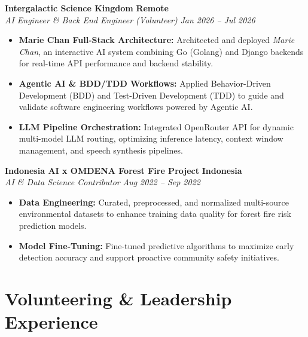 \documentclass[letterpaper,10pt]{article}
\begin{document}
\noindent \textbf{\large Intergalactic Science Kingdom} \hfill \textbf{Remote} \\
\textit{AI Engineer \& Back End Engineer (Volunteer)} \hfill \textit{Jan 2026 -- Jul 2026}
\begin{itemize}
    \item \textbf{Marie Chan Full-Stack Architecture:} Architected and deployed \textit{Marie Chan}, an interactive AI system combining Go (Golang) and Django backends for real-time API performance and backend stability.
    \item \textbf{Agentic AI \& BDD/TDD Workflows:} Applied Behavior-Driven Development (BDD) and Test-Driven Development (TDD) to guide and validate software engineering workflows powered by Agentic AI.
    \item \textbf{LLM Pipeline Orchestration:} Integrated OpenRouter API for dynamic multi-model LLM routing, optimizing inference latency, context window management, and speech synthesis pipelines.
\end{itemize}
\vspace{3pt}

\noindent \textbf{\large Indonesia AI x OMDENA Forest Fire Project} \hfill \textbf{Indonesia} \\
\textit{AI \& Data Science Contributor} \hfill \textit{Aug 2022 -- Sep 2022}
\begin{itemize}
    \item \textbf{Data Engineering:} Curated, preprocessed, and normalized multi-source environmental datasets to enhance training data quality for forest fire risk prediction models.
    \item \textbf{Model Fine-Tuning:} Fine-tuned predictive algorithms to maximize early detection accuracy and support proactive community safety initiatives.
\end{itemize}

\newpage

\section{Volunteering \& Leadership Experience}
\vspace{2pt}
\end{document}
